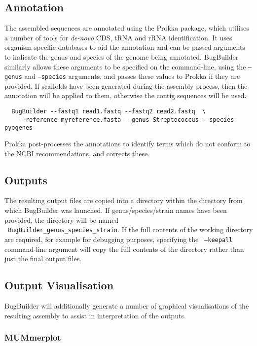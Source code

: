 \documentclass[a4paper,10pt]{article}
\begin{document}
\subsection{Annotation}

The assembled sequences are annotated using the Prokka package, which utilises
a number of tools for \textit{de-novo} CDS, tRNA and rRNA  identification. It
uses organism specific databases to aid the annotation and can be passed
arguments to indicate the genus and species of the genome being annotated.
BugBuilder similarly allows these arguments to be specified on the
command-line, using the {\tt --genus} and {\tt --species} arguments, and passes
these values to Prokka if they are provided. If scaffolds have been generated
during the assembly process, then the annotation will be applied to them,
otherwise the contig sequences will be used.

\begin{verbatim}
  BugBuilder --fastq1 read1.fastq --fastq2 read2.fastq  \
    --reference myreference.fasta --genus Streptococcus --species pyogenes
\end{verbatim}

Prokka post-processes the annotations to identify terms which do not conform to
the NCBI recommendations, and corrects these. 

\subsection{Outputs}

The resulting output files are copied into a directory within the directory
from which BugBuilder was launched. If genus/species/strain names have been
provided, the directory will be named \\ {\tt
BugBuilder\_genus\_species\_strain}. If the full contents of the working
directory are required, for example for debugging purposes, specifying the {\tt
--keepall} command-line argument will copy the full contents of the directory
rather than just the final output files.

\subsection{Output Visualisation}

BugBuilder will additionally generate a number of graphical visualisations of
the resulting assembly to assist in interpretation of the outputs.

\subsubsection{MUMmerplot}
\end{document}
